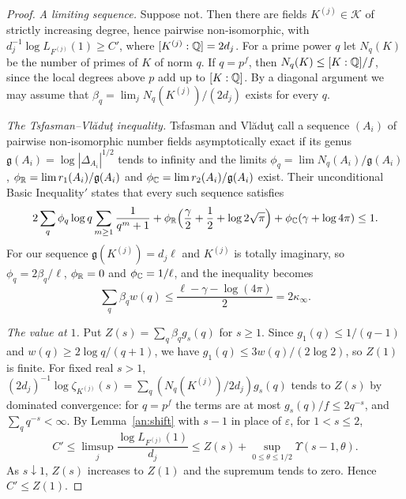 \begin{proof}
\emph{A limiting sequence.} Suppose not. Then there are fields $K^{(j)}\in\mathcal K$ of strictly
increasing degree, hence pairwise non-isomorphic, with
$d_j^{-1}\log L_{F^{(j)}}(1)\ge C'$, where $[K^{(j)}:\mathbb Q]=2d_j$. For a prime power $q$
let $N_q(K)$ be the number of primes of $K$ of norm $q$. If $q=p^f$, then
$N_q(K)\le[K:\mathbb Q]/f$, since the local degrees above $p$ add up to $[K:\mathbb Q]$.
By a diagonal argument we may assume that
$\beta_q=\lim_jN_q(K^{(j)})/(2d_j)$ exists for every $q$.

\emph{The Tsfasman--Vl\u{a}du\c{t} inequality.} Tsfasman and
Vl\u{a}du\c{t} call a sequence $(A_i)$ of pairwise
non-isomorphic number fields asymptotically exact if its genus
$\mathfrak g(A_i)=\log|\Delta_{A_i}|^{1/2}$ tends to infinity and the limits
$\phi_q=\lim N_q(A_i)/\mathfrak g(A_i)$,
$\phi_\mathbb R=\lim r_1(A_i)/\mathfrak g(A_i)$ and
$\phi_\mathbb C=\lim r_2(A_i)/\mathfrak g(A_i)$ exist. Their unconditional Basic
Inequality$'$ \cite[Section~3.2, Proposition~3.1]{TsfasmanVladut2002} states
that every such sequence satisfies
\[
 2\sum_q\phi_q\log q\sum_{m\ge1}\frac1{q^m+1}
 +\phi_\mathbb R\Bigl(\frac\gamma2+\frac12+\log2\sqrt\pi\Bigr)
 +\phi_\mathbb C(\gamma+\log4\pi)\le1.
\]
For our sequence $\mathfrak g(K^{(j)})=d_j\ell$ and $K^{(j)}$ is totally imaginary, so
$\phi_q=2\beta_q/\ell$, $\phi_\mathbb R=0$ and $\phi_\mathbb C=1/\ell$, and the inequality
becomes
\begin{equation}\label{an:tv-budget}
 \sum_q\beta_qw(q)\le\frac{\ell-\gamma-\log(4\pi)}2=2\kappa_\infty.
\end{equation}

\emph{The value at $1$.} Put $Z(s)=\sum_q\beta_qg_s(q)$ for $s\ge1$. Since $g_1(q)\le1/(q-1)$ and
$w(q)\ge2\log q/(q+1)$, we have $g_1(q)\le3w(q)/(2\log2)$, so $Z(1)$ is
finite. For fixed real $s>1$,
$(2d_j)^{-1}\log\zeta_{K^{(j)}}(s)=\sum_q(N_q(K^{(j)})/2d_j)g_s(q)$ tends to $Z(s)$ by
dominated convergence: for $q=p^f$ the terms are at most
$g_s(q)/f\le2q^{-s}$, and $\sum_q q^{-s}<\infty$. By Lemma~\ref{an:shift}
with $s-1$ in place of $\varepsilon$, for $1<s\le2$,
\[
 C'\le\limsup_j\frac{\log L_{F^{(j)}}(1)}{d_j}
 \le Z(s)+\sup_{0\le\theta\le1/2}\Upsilon(s-1,\theta).
\]
As $s\downarrow1$, $Z(s)$ increases to $Z(1)$ and the supremum tends to
zero. Hence $C'\le Z(1)$.


\end{proof}
